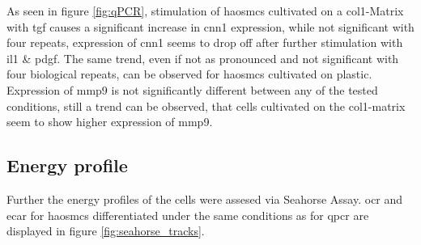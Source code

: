     As seen in figure \ref{fig:qPCR}, stimulation of \acp{haosmc} cultivated on a \ac{col1}-Matrix with \ac{tgf} causes a significant increase in \ac{cnn1} expression, while not significant with four repeats, expression of \ac{cnn1} seems to drop off after further stimulation with \ac{il1} \& \ac{pdgf}. The same trend, even if not as pronounced and not significant with four biological repeats, can be observed for \acp{haosmc} cultivated on plastic. Expression of \ac{mmp9} is not significantly different between any of the tested conditions, still a trend can be observed, that cells cultivated on the \ac{col1}-matrix seem to show higher expression of \ac{mmp9}.

    \subsection{Energy profile}
    Further the energy profiles of the cells were assesed via Seahorse Assay. \ac{ocr} and \ac{ecar} for \acp{haosmc} differentiated under the same conditions as for \ac{qpcr} are displayed in figure \ref{fig:seahorse_tracks}.

